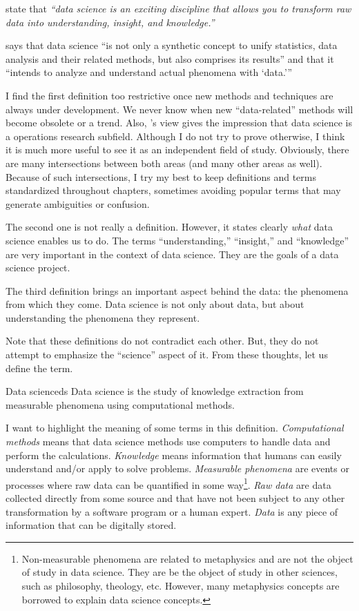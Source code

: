 \textcite{Wickham2023} state that \emph{``data science is an exciting discipline that
allows you to transform raw data into understanding, insight, and knowledge.''}

\textcite{Hayashi1998} says that data science ``is not only a
synthetic concept to unify statistics, data analysis and their related methods, but also
comprises its results'' and that it ``intends to analyze and understand actual phenomena
with `data.'{}''

I find the first definition too restrictive once new methods and techniques are always
under development.  We never know when new ``data-related'' methods will become obsolete
or a trend.  Also, \citeauthor{Zumel2019}'s view gives the impression that data science is a
operations research subfield.  Although I do not try to prove otherwise, I think it
is much more useful to see it as an independent field of study.  Obviously, there are
many intersections between both areas (and many other areas as well).  Because of such
intersections, I try my best to keep definitions and
terms standardized throughout chapters, sometimes avoiding popular terms that may generate
ambiguities or confusion.

The second one is not really a definition.  However, it states clearly \emph{what} data
science enables us to do.  The terms ``understanding,'' ``insight,'' and ``knowledge'' are
very important in the context of data science.  They are the goals of a data science
project.

The third definition brings an important aspect behind the data: the phenomena from which
they come.  Data science is not only about data, but about understanding the phenomena
they represent.

Note that these definitions do not contradict each other.  But, they do not attempt to
emphasize the ``science'' aspect of it.  From these thoughts, let us define the term.

\begin{defbox}{Data science}{ds}
  Data science is the study of knowledge extraction from
  measurable phenomena using computational methods.
\end{defbox}

I want to highlight the meaning of some terms in this definition.  \emph{Computational methods} means
that data science methods use computers to handle data and perform the calculations.
\emph{Knowledge} means information that humans can easily understand and/or apply to solve
problems.  \emph{Measurable phenomena} are events or processes where raw data can be
quantified in some way\footnote{%
  Non-measurable phenomena are related to metaphysics and are not the object of study in
  data science.  They are be the object of study in other sciences, such as
  philosophy, theology, etc.  However, many metaphysics concepts are borrowed to
  explain data science concepts.%
}.  \emph{Raw data} are data collected directly from some source and
that have not been subject to any other transformation by a software program or a human
expert.  \emph{Data} is any piece of information that can be digitally stored.


